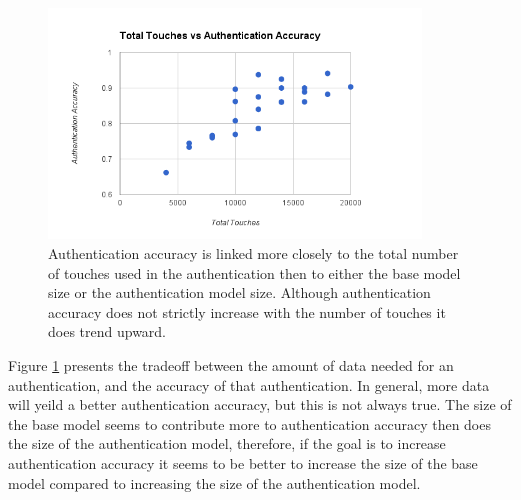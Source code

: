 \documentclass{acm_proc_article-sp}
\begin{document}
\begin{figure}
\centering
\includegraphics[width=3.9in]{total_touches_vs_authentication_accuracy.png}
\caption{Authentication accuracy is linked more closely to the total number of touches used in the authentication then to either the base model size or the authentication model size. Although authentication accuracy does not strictly increase with the number of touches it does trend upward.}
\label{fig:total_touches_vs_authentication_accuracy}
\end{figure}

%
Figure \ref{fig:total_touches_vs_authentication_accuracy} presents the tradeoff between the amount of data needed for an authentication, and the accuracy of that authentication.
In general, more data will yeild a better authentication accuracy, but this is not always true.
The size of the base model seems to contribute more to authentication accuracy then does the size of the authentication model, therefore, if the goal is to increase authentication accuracy it seems to be better to increase the size of the base model compared to increasing the size of the authentication model.



%
\end{document}
